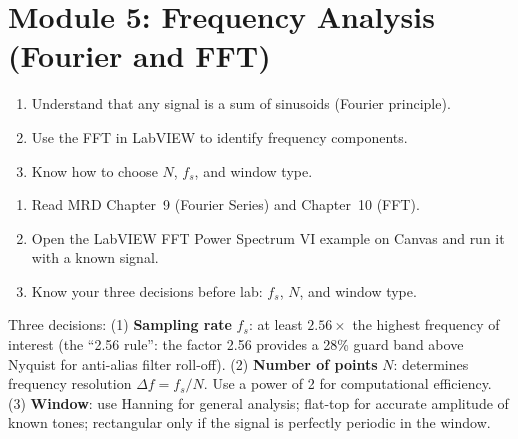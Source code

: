 \documentclass[11pt,letterpaper]{article}
\begin{document}
\section{Module 5: Frequency Analysis (Fourier and FFT)}

\begin{priorities}
\begin{enumerate}[leftmargin=*, itemsep=1pt, topsep=0pt]
    \item Understand that any signal is a sum of sinusoids (Fourier principle).
    \item Use the FFT in LabVIEW to identify frequency components.
    \item Know how to choose $N$, $f_s$, and window type.
\end{enumerate}
\end{priorities}

\begin{tcolorbox}[colback=minesblue!3, colframe=minesblue!40, boxrule=0.5pt, arc=2pt, left=6pt, right=6pt, top=3pt, bottom=3pt, fonttitle=\small\bfseries\color{minesblue}, title={Before You Start: Module 5}]
\small
\begin{enumerate}[nosep,leftmargin=*]
\item Read MRD Chapter~9 (Fourier Series) and Chapter~10 (FFT).
\item Open the LabVIEW FFT Power Spectrum VI example on Canvas and run it with a known signal.
\item Know your three decisions before lab: $f_s$, $N$, and window type.
\end{enumerate}
\end{tcolorbox}

\begin{faqbox}
Three decisions: (1) \textbf{Sampling rate} $f_s$: at least $2.56 \times$ the highest frequency of interest (the ``2.56 rule'': the factor 2.56 provides a 28\% guard band above Nyquist for anti-alias filter roll-off). (2) \textbf{Number of points} $N$: determines frequency resolution $\Delta f = f_s / N$. Use a power of 2 for computational efficiency. (3) \textbf{Window}: use Hanning for general analysis; flat-top for accurate amplitude of known tones; rectangular only if the signal is perfectly periodic in the window.
\end{faqbox}
\end{document}
